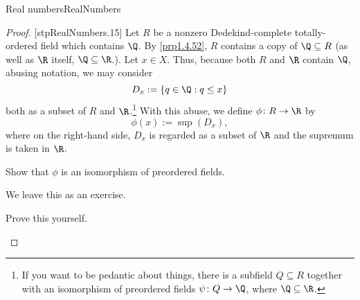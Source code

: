 \begin{thm}{Real numbers}{RealNumbers}
\begin{proof}
[stpRealNumbers.15]
Let $R$ be a nonzero Dedekind-complete totally-ordered field which contains $\Q$.  By \cref{prp1.4.52}, $R$ contains a copy of $\Q \subseteq R$ (as well as $\R$ itself, $\Q \subseteq \R$.).  Let $x\in X$.  Thus, because both $R$ and $\R$ contain $\Q$, abusing notation, we may consider
\begin{equation}
D_x:=\left\{ q\in \Q :q\leq x\right\}
\end{equation}
both as a subset of $R$ and $\R$.\footnote{If you want to be pedantic about things, there is a subfield $Q\subseteq R$ together with an isomorphism of preordered fields $\psi \colon Q\rightarrow \Q$, where $\Q \subseteq \R$.}  With this abuse, we define $\phi \colon R\rightarrow \R$ by
\begin{equation}
\phi (x):=\sup (D_x),
\end{equation}
where on the right-hand side, $D_x$ is regarded as a subset of $\R$ and the supremum is taken in $\R$.
\begin{exr}[breakable=false]{}{}
Show that $\phi$ is an isomorphism of preordered fields.
\end{exr}

We leave this as an exercise.
\begin{exr}[breakable=false]{}{}
Prove this yourself.
\end{exr}


\end{proof}
\end{thm}

